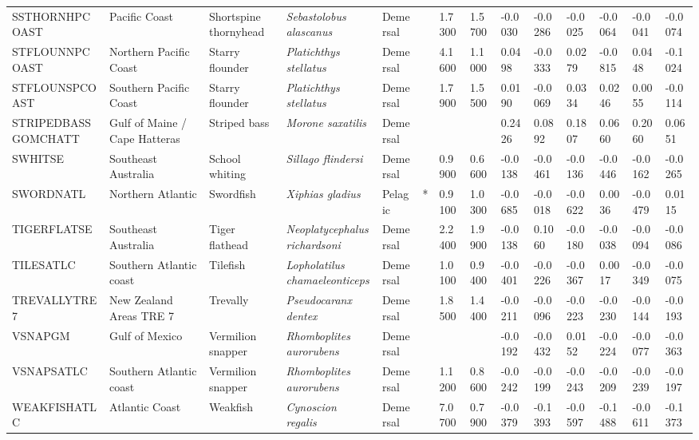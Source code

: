 \begin{longtable}{p{2.6cm}p{1.9cm}p{1.7cm}p{1.6cm}p{1cm}p{0.3cm}p{1cm}p{1cm}p{1cm}p{1.1cm}p{1cm}p{1.1cm}p{1cm}p{1.1cm}}
  SSTHORNHPCOAST & Pacific Coast & Shortspine thornyhead & \textit{Sebastolobus alascanus} & Demersal &   & 1.7300 & 1.5700 & -0.0030 & -0.0286 & -0.0025 & -0.0064 & -0.0041 & -0.0074 \\ 
  STFLOUNNPCOAST & Northern Pacific Coast & Starry flounder & \textit{Platichthys stellatus} & Demersal &   & 4.1600 & 1.1000 & 0.0498 & -0.0333 & 0.0279 & -0.0815 & 0.0448 & -0.1024 \\ 
  STFLOUNSPCOAST & Southern Pacific Coast & Starry flounder & \textit{Platichthys stellatus} & Demersal &   & 1.7900 & 1.5500 & 0.0190 & -0.0069 & 0.0334 & 0.0246 & 0.0055 & -0.0114 \\ 
  STRIPEDBASSGOMCHATT & Gulf of Maine / Cape Hatteras & Striped bass & \textit{Morone saxatilis} & Demersal &  &  &  & 0.2426 & 0.0892 & 0.1807 & 0.0660 & 0.2060 & 0.0651 \\ 
  SWHITSE & Southeast Australia & School whiting & \textit{Sillago flindersi} & Demersal &   & 0.9900 & 0.6600 & -0.0138 & -0.0461 & -0.0136 & -0.0446 & -0.0162 & -0.0265 \\ 
  SWORDNATL & Northern Atlantic & Swordfish & \textit{Xiphias gladius} & Pelagic & * & 0.9100 & 1.0300 & -0.0685 & -0.0018 & -0.0622 & 0.0036 & -0.0479 & 0.0115 \\ 
  TIGERFLATSE & Southeast Australia & Tiger flathead & \textit{Neoplatycephalus richardsoni} & Demersal &   & 2.2400 & 1.9900 & -0.0138 & 0.1060 & -0.0180 & -0.0038 & -0.0094 & -0.0086 \\ 
  TILESATLC & Southern Atlantic coast & Tilefish & \textit{Lopholatilus chamaeleonticeps} & Demersal &   & 1.0100 & 0.9400 & -0.0401 & -0.0226 & -0.0367 & 0.0017 & -0.0349 & -0.0075 \\ 
  TREVALLYTRE7 & New Zealand Areas TRE 7 & Trevally & \textit{Pseudocaranx dentex} & Demersal &   & 1.8500 & 1.4400 & -0.0211 & -0.0096 & -0.0223 & -0.0230 & -0.0144 & -0.0193 \\ 
  VSNAPGM & Gulf of Mexico & Vermilion snapper & \textit{Rhomboplites aurorubens} & Demersal &  &  &  & -0.0192 & -0.0432 & 0.0152 & -0.0224 & -0.0077 & -0.0363 \\ 
  VSNAPSATLC & Southern Atlantic coast & Vermilion snapper & \textit{Rhomboplites aurorubens} & Demersal &   & 1.1200 & 0.8600 & -0.0242 & -0.0199 & -0.0243 & -0.0209 & -0.0239 & -0.0197 \\ 
  WEAKFISHATLC & Atlantic Coast & Weakfish & \textit{Cynoscion regalis} & Demersal &   & 7.0700 & 0.7900 & -0.0379 & -0.1393 & -0.0597 & -0.1488 & -0.0611 & -0.1373 \\ 

\end{longtable}
